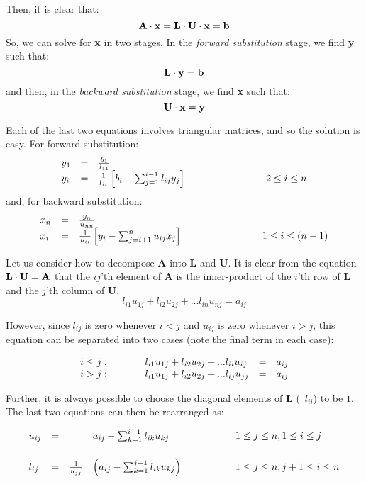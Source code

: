 Then, it is clear that:
\[
{\bf A} \cdot {\bf x} = {\bf L}\cdot{\bf U}\cdot{\bf x} = {\bf b}
\]
So, we can solve for {\bf x} in two stages.  In the {\em forward substitution\/} stage,
we find {\bf y} such that:
\[
{\bf L} \cdot {\bf y} = {\bf b}
\]
and then, in the {\em backward substitution\/} stage, we find {\bf x} such that:
\[
{\bf U} \cdot {\bf x} = {\bf y}
\]

Each of the last two equations involves triangular matrices, and so
the solution is easy.
For forward substitution:
\[
\begin{array}{llll}
y_1 & = & \frac{b_1}{l_{11}} & \\
y_i & = & \frac{1}{l_{ii}}\left[ b_i - \sum_{j=1}^{i-1}{l_{ij}y_j} \right] & \hspace*{1in} 2 \leq i \leq n
\end{array}
\]
and, for backward substitution:
\[
\begin{array}{llll}
x_n & = & \frac{y_n}{u_{nn}} & \\
x_i & = & \frac{1}{u_{ii}}\left[ y_i - \sum_{j=i+1}^{n}{u_{ij}x_j} \right] & \hspace*{1in} 1 \leq i \leq (n-1)
\end{array}
\]

Let us consider how to decompose {\bf A} into {\bf L} and {\bf U}.  It
is clear from the equation ${\bf L}\cdot{\bf U} = {\bf A}$ that the
$ij$'th element of {\bf A} is the inner-product of the $i$'th row of
{\bf L} and the $j$'th column of {\bf U}, \ie\
\[
l_{i1}u_{1j} + l_{i2}u_{2j} + ... l_{in}u_{nj} = a_{ij}
\]

However, since $l_{ij}$ is zero whenever $i < j$ and $u_{ij}$ is zero
whenever $i > j$, this equation can be separated into two cases (note
the final term in each case):

\[
\begin{array}{llll}
i \leq j: \hspace*{1cm} & l_{i1}u_{1j} + l_{i2}u_{2j} + ... l_{ii}u_{ij} & = & a_{ij} \\
i   >  j:               & l_{i1}u_{1j} + l_{i2}u_{2j} + ... l_{ij}u_{jj} & = & a_{ij}
\end{array}
\]

Further, it is always possible to choose the diagonal elements of {\bf
L} (\ie\ $l_{ii}$) to be $1$.  The last two equations can then be
rearranged as:

\[
\begin{array}{lllll}
u_{ij} &
= &
&
a_{ij} - \sum_{k=1}^{i-1}{l_{ik}u_{kj}} \hspace*{2cm} &
1 \leq j \leq n, 1 \leq i \leq j \\
\vspace*{1ex} \\
l_{ij} &
= &
\frac{1}{u_{jj}} &
\left(a_{ij} - \sum_{k=1}^{j-1}{l_{ik}u_{kj}} \right) &
1 \leq j \leq n, j+1 \leq i \leq n
\end{array}
\]

